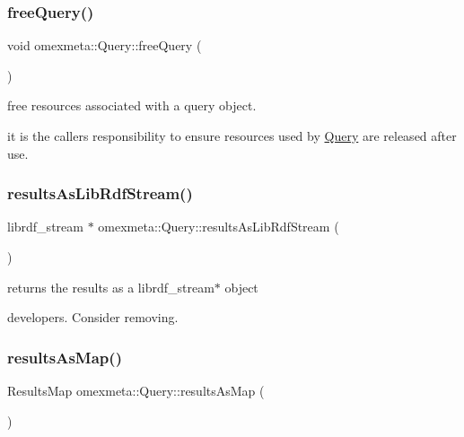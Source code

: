 \subsubsection{\texorpdfstring{free\+Query()}{freeQuery()}}
{\footnotesize\ttfamily void omexmeta\+::\+Query\+::free\+Query (\begin{DoxyParamCaption}{ }\end{DoxyParamCaption})}



free resources associated with a query object. 

it is the callers responsibility to ensure resources used by \hyperlink{classomexmeta_1_1Query}{Query} are released after use. \mbox{\label{classomexmeta_1_1Query_a0dda4502056d712d351f7057329c7688}} 
\subsubsection{\texorpdfstring{results\+As\+Lib\+Rdf\+Stream()}{resultsAsLibRdfStream()}}
{\footnotesize\ttfamily librdf\+\_\+stream $\ast$ omexmeta\+::\+Query\+::results\+As\+Lib\+Rdf\+Stream (\begin{DoxyParamCaption}{ }\end{DoxyParamCaption})}

returns the results as a librdf\+\_\+stream$\ast$ object \begin{DoxyVerb}developers. Consider removing.\end{DoxyVerb}
 \mbox{\label{classomexmeta_1_1Query_ab50cc5f76dcf7f863f9fa9d0bf755071}} 
\subsubsection{\texorpdfstring{results\+As\+Map()}{resultsAsMap()}}
{\footnotesize\ttfamily Results\+Map omexmeta\+::\+Query\+::results\+As\+Map (\begin{DoxyParamCaption}{ }\end{DoxyParamCaption})}



